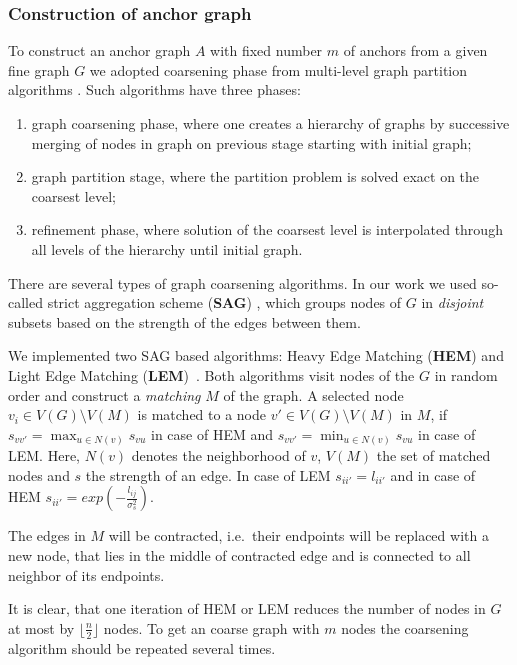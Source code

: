 \documentclass[
	fontsize=12pt,
	paper=a4,
	twoside=false,
	numbers=noenddot,
	plainheadsepline,
	toc=listof,
	toc=bibliography
]{scrartcl}
\begin{document}
\subsubsection{Construction of anchor graph}	                         
To construct an anchor graph $A$ with fixed number $m$ of anchors from a given fine graph $G$ we adopted coarsening phase from multi-level graph partition algorithms \cite{Chevalier09_GP, Safro2012_GC, Karypis95_GP, Hendrickson1995}.
Such algorithms have three phases: 
\begin{enumerate}
	\item graph coarsening phase, where one creates a hierarchy of graphs by successive merging of nodes in graph on previous stage starting with initial graph;
	\item graph partition stage, where the partition problem is solved exact on the coarsest level;
	\item refinement phase, where solution of the coarsest level is interpolated through all levels of the hierarchy until initial graph.
\end{enumerate}
There are several types of graph coarsening algorithms. In our work we used so-called strict aggregation scheme (\textbf{SAG}) \cite{Chevalier09_GP}, which groups nodes of $G$ in \emph{disjoint} subsets based on the strength of the edges between them. 

We implemented two SAG based algorithms: Heavy Edge Matching (\textbf{HEM}) and Light Edge Matching (\textbf{LEM})~\cite{Chevalier09_GP}. Both algorithms visit nodes of the $G$ in random order and construct a \emph{matching} $M$ of the graph. A selected node $v_i\in V(G)\setminus V(M)$ is matched to a node $v\prime\in V(G)\setminus V(M)$ in $M$, if $s_{vv\prime} = \max_{u\in N(v)} s_{vu}$ in case of HEM and
$s_{vv\prime} = \min_{u\in N(v)} s_{vu}$ in case of LEM. Here, $N(v)$ denotes the neighborhood of $v$, $V(M)$ the set of matched nodes and $s$ the strength of an edge. In case of LEM $s_{ii\prime} = l_{ii\prime}$ and in case of HEM $s_{ii\prime} = exp(-\frac{l_{ij}}{\sigma^2_{s}})$.

The edges in $M$ will be contracted, i.e.\ their endpoints will be replaced with a new node, that lies in the middle of contracted edge and is connected to all neighbor of its endpoints.

It is clear, that one iteration of HEM or LEM reduces the number of nodes in $G$ at most by $\lfloor\frac{n}{2} \rfloor$ nodes. To get an coarse graph with $m$ nodes the coarsening algorithm should be repeated several times.
\end{document}
